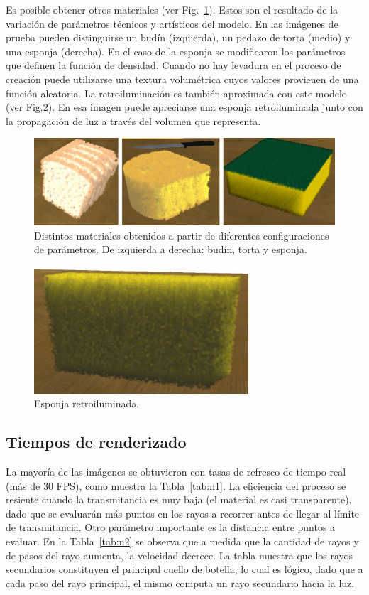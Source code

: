 Es posible obtener otros materiales (ver Fig.~\ref{fg:fig6}). Estos son el resultado de la variación de parámetros técnicos y artísticos del modelo. En las imágenes de prueba pueden distinguirse un budín (izquierda), un pedazo de torta (medio) y una esponja (derecha). En el caso de la esponja se modificaron los parámetros que definen la función de densidad. Cuando no hay levadura en el proceso de creación puede utilizarse una textura volumétrica cuyos valores provienen de una función aleatoria. La retroiluminación es también aproximada con este modelo (ver Fig.\ref{fg:fig7}). En esa imagen puede apreciarse una esponja retroiluminada junto con la propagación de luz a través del volumen que representa.

\begin{figure}[htb!]
  \centerline{\includegraphics[width=13cm]{fig6}}
  \caption{Distintos materiales obtenidos a partir de diferentes configuraciones de parámetros. De izquierda a derecha: budín, torta y esponja. }
  \label{fg:fig6}

\end{figure}

\begin{figure}[htb!]
  \centerline{\includegraphics[width=8cm]{fig7}}
  \caption{Esponja retroiluminada.}
  \label{fg:fig7}
\end{figure}

\subsection{Tiempos de renderizado}

La mayoría de las imágenes se obtuvieron con tasas de refresco de tiempo real (más de 30 FPS), como muestra la Tabla~\ref{tab:n1}. La eficiencia del proceso se resiente cuando la transmitancia es muy baja (el material es casi transparente), dado que se evaluarán más puntos en los rayos a recorrer antes de llegar al límite de transmitancia. Otro parámetro importante es la distancia entre puntos a evaluar. En la Tabla~\ref{tab:n2} se observa que a medida que la cantidad de rayos y de pasos del rayo aumenta, la velocidad decrece. La tabla muestra que los rayos secundarios constituyen el principal cuello de botella, lo cual es lógico, dado que a cada paso del rayo principal, el mismo computa un rayo secundario hacia la luz.

